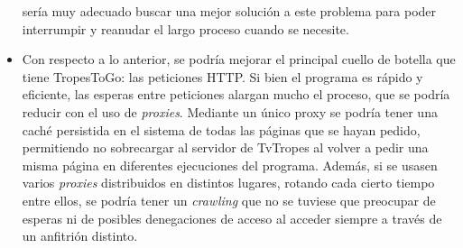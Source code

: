 \begin{itemize}
    sería muy adecuado buscar una mejor solución a este problema para poder
    interrumpir y reanudar el largo proceso cuando se necesite.
    \item Con respecto a lo anterior, se podría mejorar el principal cuello de
    botella que tiene TropesToGo: las peticiones HTTP. Si bien el programa es
    rápido y eficiente, las esperas entre peticiones alargan mucho el proceso,
    que se podría reducir con el uso de \textit{proxies}. Mediante un único proxy
    se podría tener una caché persistida en el sistema de todas las páginas que
    se hayan pedido, permitiendo no sobrecargar al servidor de TvTropes al
    volver a pedir una misma página en diferentes ejecuciones del programa.
    Además, si se usasen varios \textit{proxies} distribuidos en distintos
    lugares, rotando cada cierto tiempo entre ellos, se podría tener un
    \textit{crawling} que no se tuviese que preocupar de esperas ni de posibles
    denegaciones de acceso al acceder siempre a través de un anfitrión distinto.
\end{itemize}
